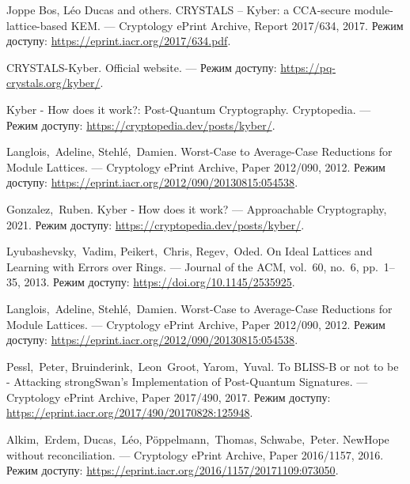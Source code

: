 \begin{thebibliography}    
       Joppe Bos, Léo Ducas and others. CRYSTALS – Kyber: a CCA-secure module-lattice-based KEM. ---  
        \newblock Cryptology ePrint Archive, Report 2017/634, 2017.  
        \newblock Режим доступу: \url{https://eprint.iacr.org/2017/634.pdf}.

        CRYSTALS-Kyber. Official website. ---  
        \newblock Режим доступу: \url{https://pq-crystals.org/kyber/}.

        Kyber - How does it work?: Post-Quantum Cryptography. Cryptopedia. ---  
        \newblock Режим доступу: \url{https://cryptopedia.dev/posts/kyber/}.

        Langlois,~Adeline, Stehlé,~Damien. Worst-Case to Average-Case Reductions for Module Lattices. --- 
        \newblock Cryptology ePrint Archive, Paper 2012/090, 2012.  
        \newblock Режим доступу: \url{https://eprint.iacr.org/2012/090/20130815:054538}.

        Gonzalez,~Ruben. Kyber - How does it work? ---  
        \newblock Approachable Cryptography, 2021.  
        \newblock Режим доступу: \url{https://cryptopedia.dev/posts/kyber/}.

    Lyubashevsky,~Vadim, Peikert,~Chris, Regev,~Oded. On Ideal Lattices and Learning with Errors over Rings. ---  
    \newblock Journal of the ACM, vol.~60, no.~6, pp.~1--35, 2013.  
    \newblock Режим доступу: \url{https://doi.org/10.1145/2535925}.

        Langlois,~Adeline, Stehlé,~Damien. Worst-Case to Average-Case Reductions for Module Lattices. ---  
        \newblock Cryptology ePrint Archive, Paper 2012/090, 2012.  
        \newblock Режим доступу: \url{https://eprint.iacr.org/2012/090/20130815:054538}.
    
        Pessl,~Peter, Bruinderink,~Leon~Groot, Yarom,~Yuval. To BLISS-B or not to be - Attacking strongSwan’s Implementation of Post-Quantum Signatures. ---  
        \newblock Cryptology ePrint Archive, Paper 2017/490, 2017.  
        \newblock Режим доступу: \url{https://eprint.iacr.org/2017/490/20170828:125948}.
    
        Alkim,~Erdem, Ducas,~Léo, Pöppelmann,~Thomas, Schwabe,~Peter. NewHope without reconciliation. ---  
        \newblock Cryptology ePrint Archive, Paper 2016/1157, 2016.  
        \newblock Режим доступу: \url{https://eprint.iacr.org/2016/1157/20171109:073050}.
    

\end{thebibliography}
